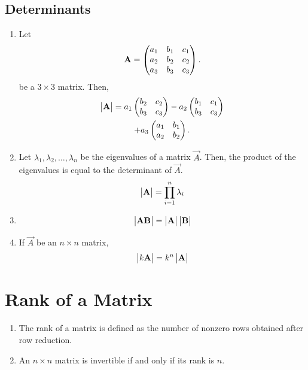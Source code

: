 \documentclass[journal,12pt,twocolumn]{IEEEtran}
\renewcommand\thesection{\arabic{section}}
\renewcommand\thesubsection{\thesection.\arabic{subsection}}
\begin{document}
\subsection{Determinants}
\renewcommand{\theequation}{\theenumi}
\begin{enumerate}[label=\thesubsection.\arabic*.,ref=\thesubsection.\theenumi]

\item Let 
\begin{align}
	\mathbf{A} = \begin{pmatrix} a_1 & b_1 & c_1  \\ a_2 & b_2 & c_2  \\ a_3 & b_3 & c_3\end{pmatrix}.
\end{align}
be a $3 \times 3$ matrix. 
Then, 
\begin{multline}
	\begin{vmatrix}\mathbf{A}\end{vmatrix} = a_1 \begin{pmatrix}  b_2 & c_2 \\  b_3 & c_3\end{pmatrix} - a_2\begin{pmatrix}  b_1 & c_1 \\  b_3 & c_3 \end{pmatrix}  \\ + a_3\begin{pmatrix} a_1 & b_1 \\ a_2 & b_2 \end{pmatrix}.
\end{multline}
\item Let $\lambda_1,\lambda_2, \dots, \lambda_n$ be the eigenvalues of a matrix $\vec{A}$.  Then,   the product of the eigenvalues is equal to the determinant of $\vec{A}$.
\begin{align}
	\begin{vmatrix}\mathbf{A}\end{vmatrix} = \prod_{i=1}^{n}\lambda_i
\end{align}
%
\item 
\begin{align}
	\begin{vmatrix}\mathbf{A}\mathbf{B}\end{vmatrix} = \begin{vmatrix}\mathbf{A}\end{vmatrix}\begin{vmatrix}\mathbf{B}\end{vmatrix}
\end{align}
\item If $\vec{A}$ be an $n \times n$ matrix, 
\begin{align}
	\begin{vmatrix}k\mathbf{A}\end{vmatrix} = k^n\begin{vmatrix}\mathbf{A}\end{vmatrix}
\end{align}

\end{enumerate}
\section{Rank of a Matrix}
\renewcommand{\theequation}{\theenumi}
\begin{enumerate}[label=\thesection.\arabic*.,ref=\thesection.\theenumi]
\item The rank of a matrix is defined as the number of nonzero rows obtained after row reduction.
\item An $n \times n$ matrix is invertible if and only if its rank is $n$.
\end{enumerate}
\end{document}
